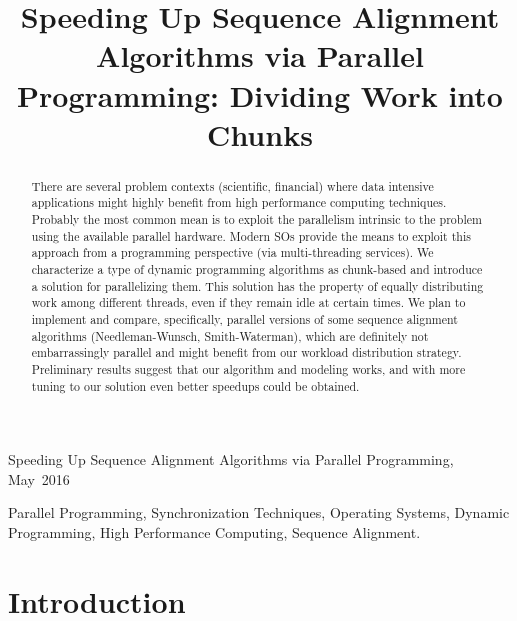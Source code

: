 \documentclass[journal]{IEEEtran}
\begin{document}
\title{Speeding Up Sequence Alignment Algorithms via Parallel Programming: Dividing Work into Chunks}

\author{
}

%
{Speeding Up Sequence Alignment Algorithms via Parallel Programming, May~2016}

\maketitle

\begin{abstract}
	There are several problem contexts (scientific, financial) where data intensive applications might highly benefit from high performance computing techniques. Probably the most common mean is to exploit the parallelism intrinsic to the problem using the available parallel hardware. Modern SOs provide the means to exploit this approach from a programming perspective (via multi-threading services). We characterize a type of dynamic programming algorithms as chunk-based and introduce a solution for parallelizing them. This solution has the property of equally distributing work among different threads, even if they remain idle at certain times. We plan to implement and compare, specifically, parallel versions of some sequence alignment algorithms (Needleman-Wunsch, Smith-Waterman), which are definitely not embarrassingly parallel and might benefit from our workload distribution strategy. Preliminary results suggest that our algorithm and modeling works, and with more tuning to our solution even better speedups could be obtained.
\end{abstract}

\begin{IEEEkeywords}
	Parallel Programming, Synchronization Techniques, Operating Systems, Dynamic Programming, High Performance Computing, Sequence Alignment.
\end{IEEEkeywords}

\section{Introduction}
\end{document}
